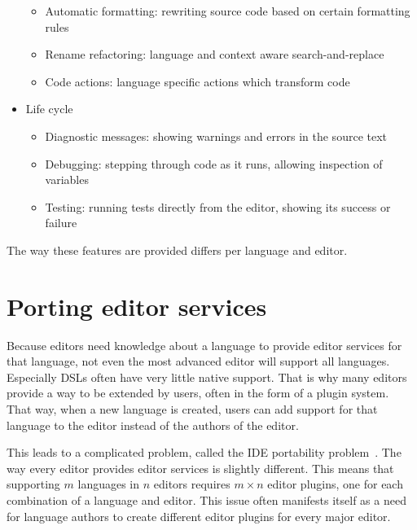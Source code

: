 \begin{itemize}
\begin{itemize}
        \vspace{-2\topsep}
        \setlength\itemsep{-0.3em}
        \item Automatic formatting: rewriting source code based on certain formatting rules
        \item Rename refactoring: language and context aware search-and-replace
        \item Code actions: language specific actions which transform code
    \end{itemize}
    \item Life cycle
    \begin{itemize}
        \vspace{-2\topsep}
        \setlength\itemsep{-0.3em}
        \item Diagnostic messages: showing warnings and errors in the source text
        \item Debugging: stepping through code as it runs, allowing inspection of variables
        \item Testing: running tests directly from the editor, showing its success or failure
    \end{itemize}
\end{itemize}

The way these features are provided differs per language and editor.


\section{Porting editor services}\label{sec:porting-editor-services}

Because editors need knowledge about a language to provide editor services for that language, not even the most advanced editor will support all languages.
Especially \acp{DSL} often have very little native support.
That is why many editors provide a way to be extended by users, often in the form of a plugin system.
That way, when a new language is created, users can add support for that language to the editor instead of the authors of the editor.

This leads to a complicated problem, called the \ac{IDE} portability problem~\autocite{KeidelPE16}.
The way every editor provides editor services is slightly different.
This means that supporting $m$ languages in $n$ editors requires $m \times n$ editor plugins, one for each
combination of a language and editor.
This issue often manifests itself as a need for language authors to create different editor plugins for every major editor.

